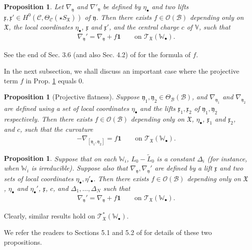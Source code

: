\documentclass[12pt,a4paper,notitlepage]{article}
\theoremstyle{definition}
\theoremstyle{plain}
\newtheorem{pp}[df]{Proposition}
\newcommand{\fk}{\mathfrak}
\newcommand{\mc}{\mathcal}
\newcommand{\wtd}{\widetilde}
\newcommand{\id}{\mathbf{1}}
\newcommand{\scr}{\mathscr}
\newcommand{\xk}{\mathfrak x}
\newcommand{\yk}{\mathfrak y}
\newcommand{\SX}{{S_{\fk X}}}
\newcommand{\blt}{\bullet}
\newcommand{\Vbb}{\mathbb V}
\newcommand{\Wbb}{\mathbb W}
\numberwithin{equation}{section}
\begin{document}
\begin{pp}\label{lb152}
Let $\nabla_\yk$ and $\nabla'_\yk$ be defined by $\eta_\blt$ and two lifts $\xk,\xk'\in H^0(\mc C,\Theta_{\mc C}(\star\SX))$ of $\yk$. Then there exists $f\in \scr O(\mc B)$ depending only on $\fk X$, the local coordinates $\eta_\blt$, $\xk$ and $\xk'$, and the central charge $c$ of $\Vbb$, such that
\begin{align}
\nabla_\yk'=\nabla_\yk+f\id\qquad\text{on }\scr T_{\fk X}(\Wbb_\blt).
\end{align}
\end{pp}

See the end of Sec. 3.6 (and also Sec. 4.2) of \cite{Gui} for the formula of $f$.

In the next subsection, we shall discuss an important case where the projective term $f$ in Prop. \ref{lb152} equals $0$.

\begin{pp}[Projective flatness]
Suppose $\yk_1,\yk_2\in\Theta_{\mc B}(\mc B)$, and $\nabla_{\yk_1}$ and $\nabla_{\yk_2}$ are defined using a set of local coordinates $\eta_\blt$ and the lifts $\xk_1,\xk_2$ of $\yk_1,\yk_2$ respectively. Then  there exists $f\in\scr O(\mc B)$ depending only on $\fk X$, $\eta_\blt$, $\xk_1$ and $\xk_2$, and $c$, such that the curvature
\begin{align*}
[\nabla_{\yk_1},\nabla_{\yk_2}]-\nabla_{[\yk_1,\yk_2]}=f\id\qquad \text{on }\scr T_{\fk X}(\Wbb_\blt).
\end{align*}
\end{pp}

\begin{pp}
Suppose  that on each $\Wbb_i$, $L_0-\wtd L_0$ is a constant $\Delta_i$ (for instance, when $\Wbb_i$ is irreducible). Suppose also that $\nabla_\yk,\nabla_\yk'$ are defined by a lift $\xk$ and two sets of local coordinates $\eta_\blt,\eta'_\blt$. Then  there exists $f\in\scr O(\mc B)$ depending only on $\fk X$, $\eta_\blt$ and $\eta_\blt'$, $\xk$, $c$, and $\Delta_1,\dots,\Delta_N$ such that
\begin{align}
\nabla_\yk'=\nabla_\yk+f\id\qquad\text{on }\scr T_{\fk X}(\Wbb_\blt).
\end{align}
\end{pp}
Clearly, similar results hold on $\scr T_{\fk X}^*(\Wbb_\blt)$.

We refer the readers to Sections 5.1 and 5.2 of \cite{Gui} for details of these two propositions.



\subsection{}
\end{document}
